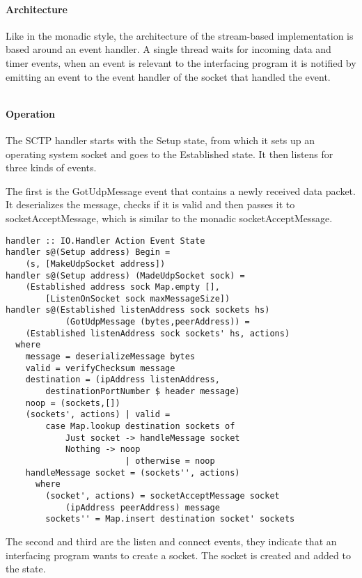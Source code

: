 \paragraph{Architecture}
Like in the monadic style, the architecture of the stream-based implementation is based around an event handler. A single thread waits for incoming data and timer events, when an event is relevant to the interfacing program it is notified by emitting an event to the event handler of the socket that handled the event.
\begin{lstlisting}[caption={The payload handler}]
\end{lstlisting}

\paragraph{Operation}
The SCTP handler starts with the Setup state, from which it sets up an operating system socket and goes to the Established state. It then listens for three kinds of events.

The first is the GotUdpMessage event that contains a newly received data packet. It deserializes the message, checks if it is valid and then passes it to socketAcceptMessage, which is similar to the monadic socketAcceptMessage.

\begin{lstlisting}[caption={The GotUdpMessage event handler}]
handler :: IO.Handler Action Event State
handler s@(Setup address) Begin =
    (s, [MakeUdpSocket address])
handler s@(Setup address) (MadeUdpSocket sock) =
    (Established address sock Map.empty [],
        [ListenOnSocket sock maxMessageSize])
handler s@(Established listenAddress sock sockets hs)
            (GotUdpMessage (bytes,peerAddress)) =
    (Established listenAddress sock sockets' hs, actions)
  where
    message = deserializeMessage bytes
    valid = verifyChecksum message
    destination = (ipAddress listenAddress,
        destinationPortNumber $ header message)
    noop = (sockets,[])
    (sockets', actions) | valid =
        case Map.lookup destination sockets of
            Just socket -> handleMessage socket
            Nothing -> noop
                        | otherwise = noop
    handleMessage socket = (sockets'', actions)
      where
        (socket', actions) = socketAcceptMessage socket
            (ipAddress peerAddress) message
        sockets'' = Map.insert destination socket' sockets
\end{lstlisting}

The second and third are the listen and connect events, they indicate that an interfacing program wants to create a socket. The socket is created and added to the state.

